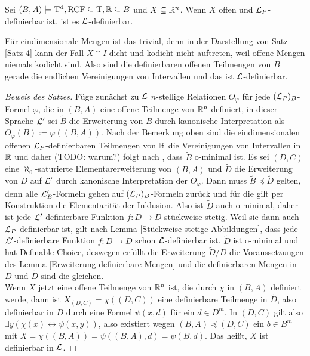 \begin{theorem}
	Sei $(B,A)\models\operatorname{T^d},\operatorname{RCF}\subseteq\operatorname{T},\mathbb{R}\subseteq B$ und $X\subseteq \mathbb{R}^n$. Wenn $X$ offen und $\mathcal{L}_P$-definierbar ist, ist es $\mathcal{L}$-definierbar.
\end{theorem}
\begin{remark}
	Für eindimensionale Mengen ist das trivial, denn in der Darstellung von Satz \ref{Satz 4} kann der Fall $X\cap I$ dicht und kodicht nicht auftreten, weil offene Mengen niemals kodicht sind. Also sind die definierbaren offenen Teilmengen von $B$ gerade die endlichen Vereinigungen von Intervallen und das ist $\mathcal{L}$-definierbar.
\end{remark}
\begin{proof}[Beweis des Satzes]
	Füge zunächst zu $\mathcal{L}$ $n$-stellige Relationen $O_\varphi$ für jede $(\mathcal{L}_P)_B$-Formel $\varphi$, die in $(B,A)$ eine offene Teilmenge von $\mathbb{R}^n$ definiert, in dieser Sprache $\mathcal{L}'$ sei $\tilde{B}$ die Erweiterung von $B$ durch kanonische Interpretation als $O_\varphi(B):=\varphi((B,A))$. Nach der Bemerkung oben sind die eindimensionalen offenen $\mathcal{L}_P$-definierbaren Teilmengen von $\mathbb{R}$ die Vereinigungen von Intervallen in $\mathbb{R}$ und daher (TODO: warum?) folgt nach \cite{MillSpeiss}, dass $\tilde{B}$ o-minimal ist. Es sei $(D,C)$ eine $\aleph_0$-saturierte Elementarerweiterung von $(B,A)$ und $\tilde{D}$ die Erweiterung von $D$ auf $\mathcal{L}'$ durch kanonische Interpretation der $O_\varphi$. Dann muss $\tilde{B}\preceq\tilde{D}$ gelten, denn alle $\mathcal{L}'_B$-Formeln gehen auf $(\mathcal{L}_P)_B$-Formeln zurück und für die gilt per Konstruktion die Elementarität der Inklusion. Also ist $\tilde{D}$ auch o-minimal, daher ist jede $\mathcal{L}'$-definierbare Funktion $f:D\rightarrow D$ stückweise stetig. Weil sie dann auch $\mathcal{L}_P$-definierbar ist, gilt nach Lemma \ref{Stückweise stetige Abbildungen}, dass jede $\mathcal{L}'$-definierbare Funktion $f:D\rightarrow D$ schon $\mathcal{L}$-definierbar ist. $\tilde{D}$ ist o-minimal und hat Definable Choice, deswegen erfüllt die Erweiterung $\tilde{D}/D$ die Voraussetzungen des Lemma \ref{Erweiterung definierbare Mengen} und die definierbaren Mengen in $D$ und $\tilde{D}$ sind die gleichen.\\
	Wenn $X$ jetzt eine offene Teilmenge von $\mathbb{R}^n$ ist, die durch $\chi$ in $(B,A)$ definiert werde, dann ist $X_{(D,C)}=\chi((D,C))$ eine definierbare Teilmenge in $\tilde{D}$, also definierbar in $D$ durch eine Formel $\psi(x,d)$ für ein $d\in D^m$. In $(D,C)$ gilt also $\exists y(\chi(x)\leftrightarrow\psi(x,y))$, also existiert wegen $(B,A)\preceq(D,C)$ ein $b\in B^m$ mit $X=\chi((B,A))=\psi((B,A),d)=\psi(B,d)$. Das heißt, $X$ ist definierbar in $\mathcal{L}$.
\end{proof}
